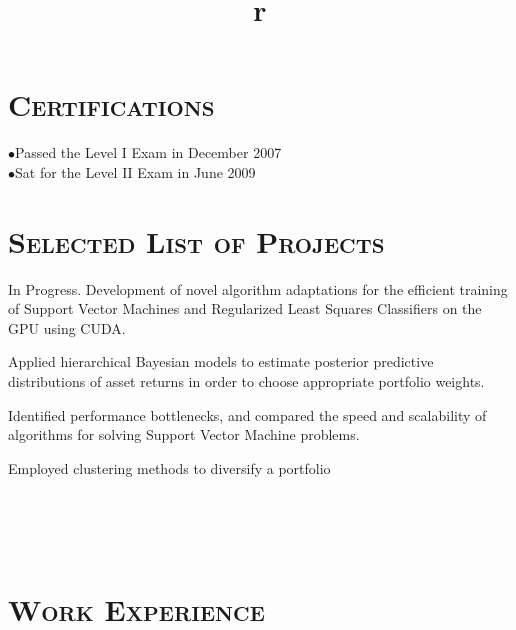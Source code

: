 \begin{resume}
\section{\textsc{Certifications}}
\begin{position}
$\bullet$Passed the Level I Exam in December 2007 \\
$\bullet$Sat for the Level II Exam in June 2009  
\end{position}


\section{\textsc{Selected List of Projects}}
\begin{position}
In Progress. Development of novel algorithm adaptations for the efficient training of Support Vector Machines and Regularized Least Squares Classifiers on the GPU using CUDA.
\end{position}

\begin{position}
Applied hierarchical Bayesian models to estimate posterior predictive distributions of asset returns in order to choose appropriate portfolio weights.
\end{position}

\begin{position}
Identified performance bottlenecks, and compared the speed and scalability of algorithms for solving Support Vector Machine problems.
\end{position}	

\begin{position}
Employed clustering methods to diversify a portfolio
\end{position}


\begin{formatb}
  \title{r}\\
  \\
  \body\\
\end{formatb}

\section{\textsc{Work Experience}}


\end{resume}
